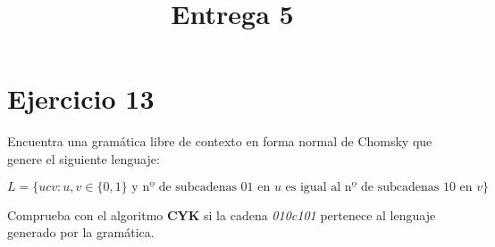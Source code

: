 \documentclass[11pt,a4paper]{article}
\title{Entrega 5}
\date{}
\begin{document}
\maketitle

\section*{Ejercicio 13}
Encuentra una gramática libre de contexto en forma normal de Chomsky que genere el siguiente lenguaje:

$$ L = \{ucv : u, v \in \{0, 1\} \text{ y nº de subcadenas } 01 \text{ en } u \text{ es igual al nº de subcadenas } 10 \text{ en } v\} $$

Comprueba con el algoritmo \textbf{CYK} si la cadena \emph{010c101} pertenece al lenguaje generado por la gramática. \\
\end{document}
